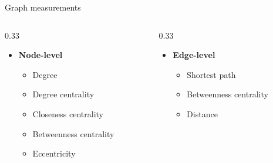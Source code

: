 \documentclass{beamer}
\begin{document}
    \begin{frame}{Graph measurements}
        \begin{columns}[t] %
            \begin{column}{0.33\textwidth}
               \begin{itemize}
                    \item \textbf{Node-level}
                    \begin{itemize}
                        \item Degree
                        \item Degree centrality
                        \item Closeness centrality
                        \item Betweenness centrality
                        \item Eccentricity
                    \end{itemize}
                \end{itemize}
            \end{column}
            
            \begin{column}{0.33\textwidth}
               \begin{itemize}
                    \item \textbf{Edge-level}
                    \begin{itemize}
                        \item Shortest path
                        \item Betweenness centrality
                        \item Distance
                    \end{itemize}
                \end{itemize}
            \end{column}


\end{columns}
\end{frame}
\end{document}

